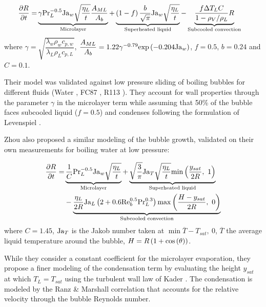 \begin{align}
 \frac{\partial{R}}{\partial t} = &\underbrace{ \gamma \mathrm{Pr}_{L}^{-0.5}\mathrm{Ja}_{w} \sqrt{\dfrac{\eta_{L}}{t}} \frac{A_{ML}}{A_{b}} }_{\text{Microlayer}} + \underbrace{\left( 1-f \right) \frac{b}{\sqrt{\pi}} \mathrm{Ja}_{w} \sqrt{\dfrac{\eta_{L}}{t}}}_{\text{Superheated liquid}} - \underbrace{\frac{f\Delta T_{L}C}{1-\rho_{V}/\rho_{L}}R}_{\text{Subcooled convection}}
\label{eq:growth_yoo}
\end{align}
where $\gamma = \sqrt{\dfrac{\lambda_{w}\rho_{w}c_{p,w}}{\lambda_{L}\rho_{L}c_{p,L}}}$, $\dfrac{A_{ML}}{A_{b}}=1.22 \gamma^{-0.79}\mathrm{exp}\left( -0.204\mathrm{Ja}_{w} \right)$, $f=0.5$, $b=0.24$ and $C=0.1$.

\npar
Their model was validated against low pressure sliding of boiling bubbles for different fluids (Water \cite{maity_effect_2000}, FC87 \cite{thorncroft_experimental_1998}, R113 \cite{yoo_experimental_2016}). They account for wall properties through the parameter $\gamma$ in the microlayer term while assuming that 50\% of the bubble faces subcooled liquid ($f=0.5$) and condenses following the formulation of Levenspiel \cite{levenspiel_collapse_1959}.


\npar

Zhou \etal \cite{zhou_experimental_2020} also proposed a similar modeling of the bubble growth, validated on their own measurements for boiling water at low pressure:


\begin{align}
\nonumber \dtime{R} = &\underbrace{ \frac{1}{C} \Pr_{L}^{-0.5}\Ja_{w} \sqrt{\dfrac{\eta_{L}}{t}} }_{\text{Microlayer}} + \underbrace{\sqrt{\dfrac{3}{\pi}}\Ja_{T} \sqrt{\dfrac{\eta_{L}}{t}}\min{\dfrac{y_{sat}}{2R},\ 1}}_{\text{Superheated liquid}}\\ 
%
& - \underbrace{\frac{\eta_{L}}{2R}\Ja_{L}\parth{2+0.6\Re_{b}^{0.5}\Pr_{L}^{0.3}}\max{\frac{H-y_{sat}}{2R},\ 0}}_{\text{Subcooled convection}}
\end{align}
where $C=1.45$, $\mathrm{Ja}_{T}$ is the Jakob number taken at $\min{\overline{T}-T_{sat},\ 0}$, $\overline{T}$ the average liquid temperature around the bubble, $H=R\left( 1+\mathrm{cos}\left( \theta \right) \right)$.

\npar

While they consider a constant coefficient for the microlayer evaporation, they propose a finer modeling of the condensation term by evaluating the height $y_{sat}$ at which $T_{L}=T_{sat}$ using the turbulent wall law of Kader \cite{kader_heat_1972}. The condensation is modeled by the Ranz \& Marshall correlation \cite{ranz_evaporation_1952} that accounts for the relative velocity through the bubble Reynolds number.


